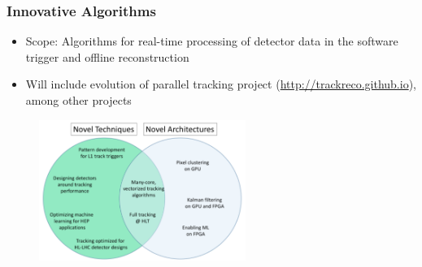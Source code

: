\begin{frame}
\frametitle{Innovative Algorithms}

\begin{itemize}
\item Scope: Algorithms for real-time processing of detector data in the software trigger and offline reconstruction 
\item Will include evolution of parallel tracking project (\url{http://trackreco.github.io}), among other projects
\end{itemize}

\begin{figure}[htbp]
\begin{center}
\includegraphics[width=0.6\textwidth]{images/IA-Venn.png}
\end{center}
\end{figure}

\end{frame}


